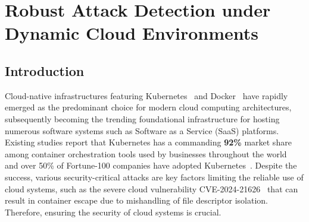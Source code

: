 \chapter{Robust Attack Detection under Dynamic Cloud Environments}

\section{Introduction}

Cloud-native infrastructures featuring Kubernetes~\cite{k8s} and Docker~\cite{docker} have rapidly emerged as the predominant choice for modern cloud computing architectures, subsequently becoming the trending foundational infrastructure for hosting numerous software systems such as Software as a Service (SaaS) platforms. Existing studies report that Kubernetes has a commanding \textbf{92\%} market share among container orchestration tools used by businesses throughout the world~\cite{datadog-study} and over 50\% of Fortune-100 companies have adopted Kubernetes~\cite{oracle-study}. Despite the success, various security-critical attacks are key factors limiting the reliable use of cloud systems, such as the severe cloud vulnerability CVE-2024-21626~\cite{cve-2024-21626} that can result in container escape due to mishandling of file descriptor isolation. Therefore, ensuring the security of cloud systems is crucial. 